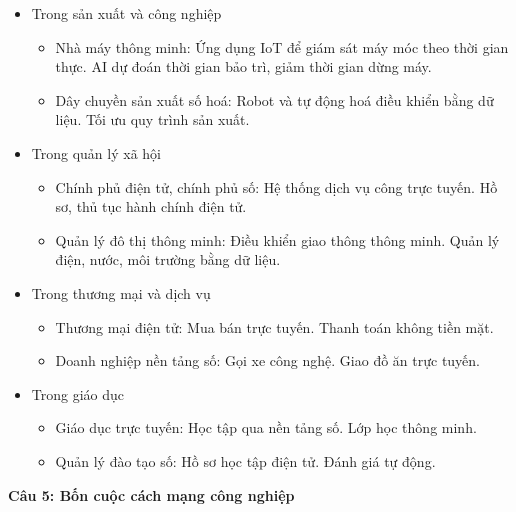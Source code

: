 \begin{itemize}
	\item Trong sản xuất và công nghiệp
	
	\begin{itemize}
		\item Nhà máy thông minh: Ứng dụng IoT để giám sát máy móc theo thời gian thực. AI dự đoán thời gian bảo trì, giảm thời gian dừng máy.
		
		\item Dây chuyền sản xuất số hoá: Robot và tự động hoá điều khiển bằng dữ liệu. Tối ưu quy trình sản xuất.
	\end{itemize}
	
	\item Trong quản lý xã hội
	
	\begin{itemize}
		\item Chính phủ điện tử, chính phủ số: Hệ thống dịch vụ công trực tuyến. Hồ sơ, thủ tục hành chính điện tử.
		
		\item Quản lý đô thị thông minh: Điều khiển giao thông thông minh. Quản lý điện, nước, môi trường bằng dữ liệu.
	\end{itemize}
	
	\item Trong thương mại và dịch vụ
	
	\begin{itemize}
		\item Thương mại điện tử: Mua bán trực tuyến. Thanh toán không tiền mặt.
		
		\item Doanh nghiệp nền tảng số: Gọi xe công nghệ. Giao đồ ăn trực tuyến.
	\end{itemize}
	
	\item Trong giáo dục
	
	\begin{itemize}
		\item Giáo dục trực tuyến: Học tập qua nền tảng số. Lớp học thông minh.
		
		\item Quản lý đào tạo số: Hồ sơ học tập điện tử. Đánh giá tự động.
	\end{itemize}
\end{itemize}

\textbf{Câu 5: Bốn cuộc cách mạng công nghiệp}

